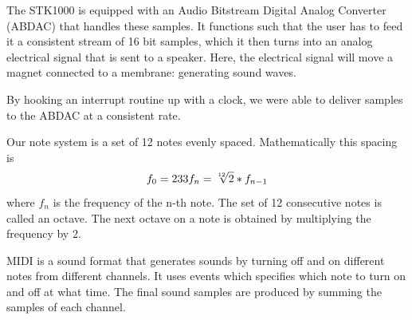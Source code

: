 \documentclass[a4paper,12pt]{article}
\begin{document}
The STK1000 is equipped with an Audio Bitstream Digital Analog Converter
(ABDAC) that handles these samples. It functions such that the user has to feed it a consistent stream of 16 bit samples, which it then turns into an analog electrical signal that is sent to a speaker. Here, the electrical signal will move a magnet connected to a membrane: generating sound waves.

By hooking an interrupt routine up with a clock, we were able to deliver samples to the ABDAC at a consistent rate.

Our note system is a set of 12 notes evenly spaced. Mathematically this spacing is 
\begin{equation}
f_0=233\\
f_n=\sqrt[12]{2} * f_{n-1}
\end{equation} 
where $f_n$ is the frequency of the n-th note. The set of 12 consecutive notes is called an octave. The next octave on a note is obtained by multiplying the frequency by 2. 

MIDI is a sound format that generates sounds by turning off and on different notes from different channels. It uses events which specifies which note to turn on and off at what time. The final sound samples are produced by summing the samples of each channel. 
\end{document}
